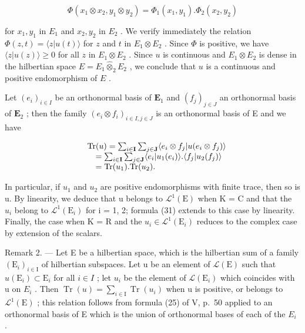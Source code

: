 \[
\Phi (x _ {1} \otimes x _ {2}, y _ {1} \otimes y _ {2}) = \Phi_ {1} (x _ {1}, y _ {1}). \Phi_ {2} (x _ {2}, y _ {2})
\]

for \(x_{1}, y_{1}\) in \(E_{1}\) and \(x_{2}, y_{2}\) in \(E_{2}\) . We verify immediately the relation \(\Phi(z, t) = \langle z|u(t) \rangle\) for \(z\) and \(t\) in \(E_{1} \otimes E_{2}\) . Since \(\Phi\) is positive, we have \(\langle z|u(z) \rangle \geqslant 0\) for all \(z\) in \(E_{1} \otimes E_{2}\) . Since \(u\) is continuous and \(E_{1} \otimes E_{2}\) is dense in the hilbertian space \(E = E_{1} \hat{\otimes}_{2} E_{2}\) , we conclude that \(u\) is a continuous and positive endomorphism of \(E\) .

Let \((e_i)_{i\in I}\) be an orthonormal basis of \(\mathbf{E}_1\) and \((f_j)_{j\in J}\) an orthonormal basis of \(\mathbf{E}_2\) ; then the family \((e_i\otimes f_i)_{i\in I,j\in J}\) is an orthonormal basis of E and we have

\[
\begin{array}{r l} & {\mathrm{Tr} (u) = \sum_ {i \in \mathbf {I}} \sum_ {j \in \mathbf {J}} \langle e _ {i} \otimes f _ {j} | u (e _ {i} \otimes f _ {j}) \rangle} \\ & {\quad = \sum_ {i \in \mathbf {I}} \sum_ {j \in \mathbf {J}} \langle e _ {i} | u _ {1} (e _ {i}) \rangle . \langle f _ {j} | u _ {2} (f _ {j}) \rangle} \\ & {\quad = \mathrm{Tr} (u _ {1}). \mathrm{Tr} (u _ {2}).} \end{array}
\]

In particular, if \(u_{1}\) and \(u_{2}\) are positive endomorphisms with finite trace, then so is u. By linearity, we deduce that u belongs to \(\mathcal{L}^{1}(\mathrm{E})\) when K = C and that the \(u_{i}\) belong to \(\mathcal{L}^{1}(\mathrm{E}_{i})\) for i = 1, 2; formula (31) extends to this case by linearity. Finally, the case when K = R and the \(u_{i} \in \mathcal{L}^{1}(\mathrm{E}_{i})\) reduces to the complex case by extension of the scalars.

Remark 2. --- Let E be a hilbertian space, which is the hilbertian sum of a family \((\mathrm{E}_{i})_{i\in\mathrm{I}}\) of hilbertian subspaces. Let u be an element of \(\mathcal{L}(\mathrm{E})\) such that \(u(\mathrm{E}_{i}) \subset \mathrm{E}_{i}\) for all \(i \in I\) ; let \(u_{i}\) be the element of \(\mathcal{L}(\mathrm{E}_{i})\) which coincides with u on \(E_{i}\) . Then \(\operatorname{Tr}(u) = \sum_{i \in \mathrm{I}} \operatorname{Tr}(u_{i})\) when u is positive, or belongs to \(\mathcal{L}^{1}(\mathrm{E})\) ; this relation follows from formula (25) of V, p.~50 applied to an orthonormal basis of E which is the union of orthonormal bases of each of the \(E_{i}\) .

